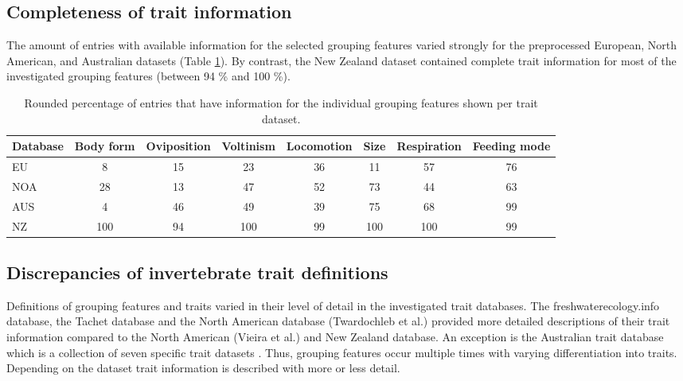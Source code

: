 \documentclass{article}
\begin{document}

\subsection*{Completeness of trait information}

The amount of entries with available information for the selected grouping features varied strongly for the preprocessed European, North American, and Australian datasets (Table \ref{tab:trait_coverage}). By contrast, the New Zealand dataset contained complete trait information for most of the investigated grouping features (between 94 \% and 100 \%).

\begin{table}[ht]
    \centering
    \caption{Rounded percentage of entries that have 
    information for the individual grouping features
    shown per trait dataset.} 
    \label{tab:trait_coverage}
    \begin{tabular}{lccccccc}
    \toprule[.1em]
    Database & Body form & Oviposition & Voltinism & Locomotion & Size & Respiration & Feeding mode \\ 
    \toprule[.1em]
    EU & 8 & 15 & 23 & 36 & 11 & 57 & 76 \\ 
    NOA & 28 & 13 & 47 & 52 & 73 & 44 & 63 \\ 
    AUS & 4 & 46 & 49 & 39 & 75 & 68 & 99 \\ 
    NZ & 100 & 94 & 100 & 99 & 100 & 100 & 99 \\ 
    \bottomrule
    \end{tabular}
\end{table}

\newpage


\subsection*{Discrepancies of invertebrate trait definitions}

Definitions of grouping features and traits varied in their level of detail in the investigated trait databases. The freshwaterecology.info database, the Tachet database and the North American database (Twardochleb et al.) provided more detailed descriptions of their trait information compared to the North American (Vieira et al.) and New Zealand database. An exception is the Australian trait database which is a collection of seven specific trait datasets \cite{kefford_integrated_2020}. Thus, grouping features occur multiple times with varying differentiation into traits. Depending on the dataset trait information is described with more or less detail.
\end{document}
